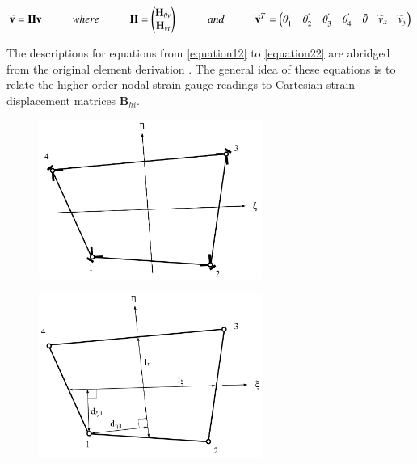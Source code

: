 \begin{equation} 
\widetilde{\mathbf{v}} = \mathbf{H v}
\hspace{10mm}
where
\hspace{10mm}
\mathbf{H} =
\begin{pmatrix}
\mathbf{H}_{\theta v} \\
\mathbf{H}_{vt}
\end{pmatrix}
\hspace{10mm}
and
\hspace{10mm}
\widetilde{\mathbf{v}}^T = 
\begin{pmatrix}
\theta_1^{'} & \theta_2^{'} & \theta_3^{'} & \theta_4^{'} & \bar{\theta} &  \widetilde{v}_x & \widetilde{v}_y
\end{pmatrix}
\label{equation11}
\end{equation}

The descriptions for equations from \eqref{equation12} to \eqref{equation22} are abridged from the original element derivation \cite{Hau94}. The general idea of these equations is to relate the higher order nodal strain gauge readings to Cartesian strain displacement matrices $\mathbf{B}_{hi}$.

\begin{figure}[H]
	\begin{minipage}{.5\textwidth}
		\centering
		\includegraphics[width=7.3cm]
		{images/ANDES_strain_gauges.png}
		\label{fig:andes_gauges}
	\end{minipage}%
	\begin{minipage}{.5\textwidth}
		\centering
		\includegraphics[width=7.3cm]
		{images/andes_geometric_quantities.png}
		\label{fig:andes_dims}
	\end{minipage}
\end{figure}

